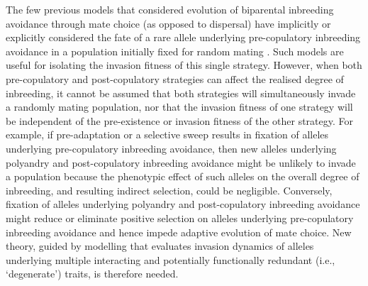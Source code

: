 \documentclass[10pt,letterpaper]{article}
\begin{document}
The few previous models that considered evolution of biparental inbreeding avoidance through mate choice (as opposed to dispersal) have implicitly or explicitly considered the fate of a rare allele underlying pre-copulatory inbreeding avoidance in a population initially fixed for random mating \cite[e.g.,][]{Parker1979, Parker2006, Duthie, Duthie2016a}. Such models are useful for isolating the invasion fitness of this single strategy. However, when both pre-copulatory and post-copulatory strategies can affect the realised degree of inbreeding, it cannot be assumed that both strategies will simultaneously invade a randomly mating population, nor that the invasion fitness of one strategy will be independent of the pre-existence or invasion fitness of the other strategy. For example, if pre-adaptation or a selective sweep results in fixation of alleles underlying pre-copulatory inbreeding avoidance, then new alleles underlying polyandry and post-copulatory inbreeding avoidance might be unlikely to invade a population because the phenotypic effect of such alleles on the overall degree of inbreeding, and resulting indirect selection, could be negligible. Conversely, fixation of alleles underlying polyandry and post-copulatory inbreeding avoidance might reduce or eliminate positive selection on alleles underlying pre-copulatory inbreeding avoidance and hence impede adaptive evolution of mate choice. New theory, guided by modelling that evaluates invasion dynamics of alleles underlying multiple interacting and potentially functionally redundant (i.e., `degenerate') traits, is therefore needed.
\end{document}
